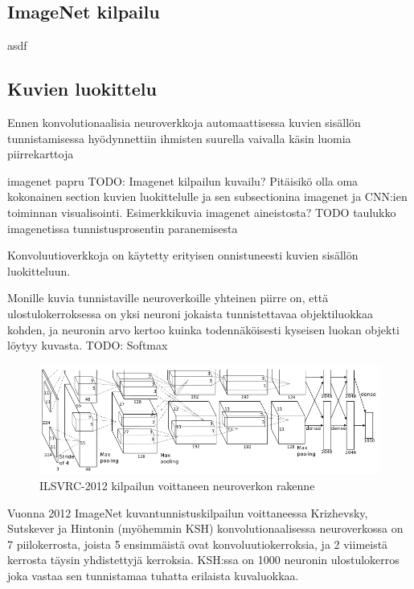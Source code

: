 \documentclass[finnish]{tktltiki2}
\theoremstyle{definition}
\theoremstyle{remark}
\begin{document}
     \subsection{ImageNet kilpailu}
     asdf

  \subsection{Kuvien luokittelu}
    Ennen konvolutionaalisia neuroverkkoja automaattisessa kuvien sisällön tunnistamisessa hyödynnettiin ihmisten suurella vaivalla käsin luomia piirrekarttoja

    imagenet papru \cite{imagenet-paper}
    TODO: Imagenet kilpailun kuvailu? Pitäisikö olla oma kokonainen section kuvien luokittelulle ja sen subsectionina imagenet ja CNN:ien toiminnan visualisointi. Esimerkkikuvia imagenet aineistosta?
    TODO taulukko imagenetissa tunnistusprosentin paranemisesta
    

    Konvoluutioverkkoja on käytetty erityisen onnistuneesti kuvien sisällön luokitteluun.

    Monille kuvia tunnistaville neuroverkoille yhteinen piirre on, että ulostulokerroksessa on yksi neuroni jokaista tunnistettavaa objektiluokkaa kohden, ja neuronin arvo kertoo kuinka todennäköisesti kyseisen luokan objekti löytyy kuvasta. TODO: Softmax

    \begin{figure}[h]
    \centering
    \includegraphics[scale=0.4]{imagenet}
    \caption{ILSVRC-2012 kilpailun voittaneen neuroverkon rakenne \cite{KSHimagenet2012}}
    \label{pic:hsk-neuralnet}
    \end{figure}

    Vuonna 2012 ImageNet kuvantunnistuskilpailun voittaneessa Krizhevsky, Sutskever ja Hintonin (myöhemmin KSH) konvolutionaalisessa neuroverkossa on 7 piilokerrosta, joista 5 ensimmäistä ovat konvoluutiokerroksia, ja 2 viimeistä kerrosta täysin yhdistettyjä kerroksia. KSH:ssa on 1000 neuronin ulostulokerros joka vastaa sen tunnistamaa tuhatta erilaista kuvaluokkaa.
    
\end{document}
